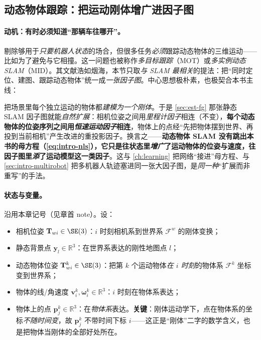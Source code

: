 \subsection{动态物体跟踪：把运动刚体增广进因子图}
\label{sec:dynamic-tracking}

\paragraph{动机：有时必须知道“那辆车往哪开”。}
剔除够用于\emph{只要机器人状态}的场合，但很多任务\emph{必须}跟踪动态物体的三维运动——比如为了避免与它相撞。这一问题也被称作\emph{多目标跟踪}（MOT）或\emph{多实例动态 SLAM}（MID）。其文献浩如烟海，本节只取\emph{与 SLAM 最相关}的提法：把“同时定位、建图、跟踪动态物体”统一成\emph{一张因子图}\cite{schmid2026dynamic}。中心思想极朴素，也极契合本书主线：

\begin{insight}[核心思想：每个运动物体 $=$ 一条额外的刚体轨迹]
把场景里每个独立运动的物体都\emph{建模为一个刚体}。于是 \cref{sec:est-fg} 那张静态 SLAM 因子图就能\emph{自然扩展}：相机位姿之间用\emph{里程计因子}相连（不变），\textbf{每个动态物体的位姿序列之间用\emph{恒速运动因子}相连}，物体上的点经“先把物体摆到世界、再投到当前相机”产生改进的重投影因子。换言之——\textbf{动态物体 SLAM 没有跳出本书的母方程（\cref{eq:intro-nls}），它只是往状态里\emph{增广}了运动物体的位姿与速度，往因子图里\emph{添}了运动模型这一类因子}。这与 \cref{ch:learning} 把网络“接进”母方程、与 \cref{sec:intro-multirobot} 把多机器人轨迹塞进同一张大因子图，是\emph{同一种}“扩展而非重写”的手法。
\end{insight}

\paragraph{状态与变量。}
沿用本章记号（见章首 note）。设：
\begin{itemize}
  \item 相机位姿 $\mathbf{T}_{wi}\in\SE(3)$：$i$ 时刻相机系到世界系 $\mathcal{F}^w$ 的刚体变换；
  \item 静态背景点 $\mathbf{y}_l\in\mathbb{R}^3$：在世界系表达的刚性地图点 $l$；
  \item 动态物体位姿 $\mathbf{T}_{wi}^{k}\in\SE(3)$：把第 $k$ 个运动物体\emph{在 $i$ 时刻}的物体系 $\mathcal{F}^k$ 坐标变到世界系；
  \item 物体的线/角速度 $\mathbf{v}_i^{k},\boldsymbol\omega_i^{k}\in\mathbb{R}^3$：$i$ 时刻在物体系表达；
  \item 物体上的点 $\mathbf{p}_j^{k}\in\mathbb{R}^3$：在\emph{物体系}表达。\textbf{关键}：刚体运动学下，点在物体系的坐标\emph{不随时间变}，故 $\mathbf{p}_j^{k}$ 不带时间下标 $i$——这正是“刚体”二字的数学含义，也是把物体当刚体的全部好处所在。
\end{itemize}

